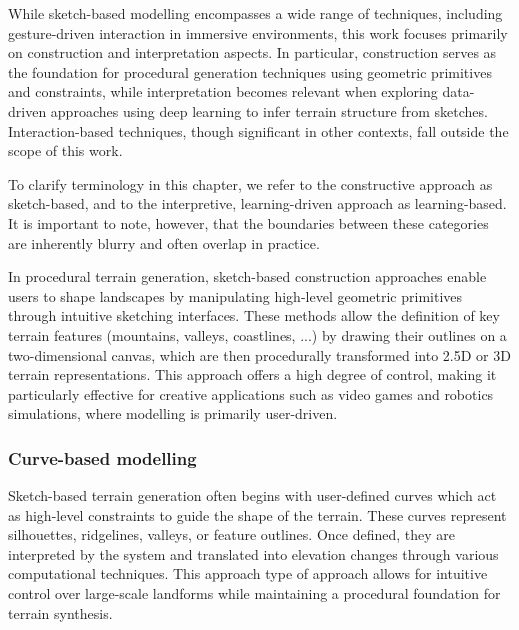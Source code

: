 While sketch-based modelling encompasses a wide range of techniques, including gesture-driven interaction in immersive environments, this work focuses primarily on construction and interpretation aspects. In particular, construction serves as the foundation for procedural generation techniques using geometric primitives and constraints, while interpretation becomes relevant when exploring data-driven approaches using deep learning to infer terrain structure from sketches. Interaction-based techniques, though significant in other contexts, fall outside the scope of this work.

To clarify terminology in this chapter, we refer to the constructive approach as sketch-based, and to the interpretive, learning-driven approach as learning-based. It is important to note, however, that the boundaries between these categories are inherently blurry and often overlap in practice.

In procedural terrain generation, sketch-based construction approaches enable users to shape landscapes by manipulating high-level geometric primitives through intuitive sketching interfaces. These methods allow the definition of key terrain features (mountains, valleys, coastlines, ...) by drawing their outlines on a two-dimensional canvas, which are then procedurally transformed into 2.5D or 3D terrain representations. This approach offers a high degree of control, making it particularly effective for creative applications such as video games and robotics simulations, where modelling is primarily user-driven.

\subsubsection{Curve-based modelling}

Sketch-based terrain generation often begins with user-defined curves which act as high-level constraints to guide the shape of the terrain. These curves represent silhouettes, ridgelines, valleys, or feature outlines. Once defined, they are interpreted by the system and translated into elevation changes through various computational techniques. This approach type of approach allows for intuitive control over large-scale landforms while maintaining a procedural foundation for terrain synthesis.

